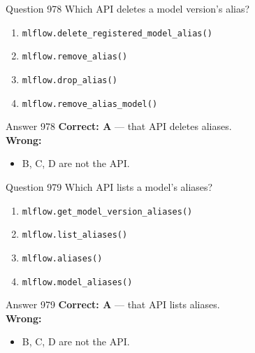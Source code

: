 \documentclass[aspectratio=169,11pt]{beamer}
\begin{document}
	\begin{frame}{Question 978}
		Which API deletes a model version's alias?
		\begin{enumerate}[label=\Alph*.]
			\item \texttt{mlflow.delete\_registered\_model\_alias()}
			\item \texttt{mlflow.remove\_alias()}
			\item \texttt{mlflow.drop\_alias()}
			\item \texttt{mlflow.remove\_alias\_model()}
		\end{enumerate}
	\end{frame}
	\begin{frame}{Answer 978}
		\textbf{Correct: A} --- that API deletes aliases.\\
		\vspace{0.5em}
		\textbf{Wrong:}
		\begin{itemize}
			\item B, C, D are not the API.
		\end{itemize}
	\end{frame}
	
	\begin{frame}{Question 979}
		Which API lists a model's aliases?
		\begin{enumerate}[label=\Alph*.]
			\item \texttt{mlflow.get\_model\_version\_aliases()}
			\item \texttt{mlflow.list\_aliases()}
			\item \texttt{mlflow.aliases()}
			\item \texttt{mlflow.model\_aliases()}
		\end{enumerate}
	\end{frame}
	\begin{frame}{Answer 979}
		\textbf{Correct: A} --- that API lists aliases.\\
		\vspace{0.5em}
		\textbf{Wrong:}
		\begin{itemize}
			\item B, C, D are not the API.
		\end{itemize}
	\end{frame}
	
\end{document}
